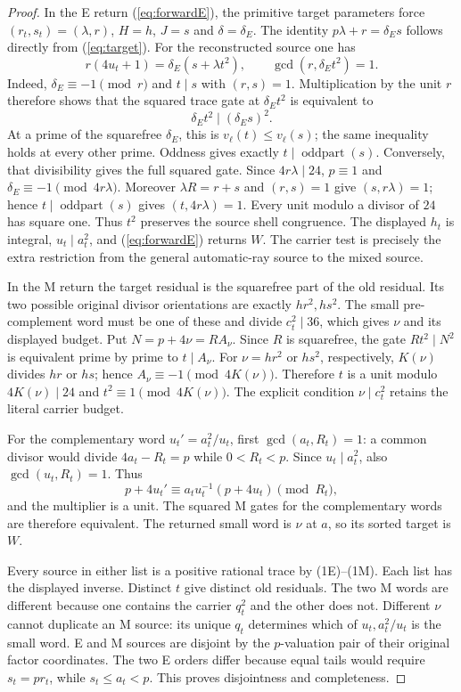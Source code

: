 \begin{proof}
In the E return (\ref{eq:forwardE}), the primitive target parameters force
$(r_t,s_t)=(\lambda,r)$, $H=h$, $J=s$ and $\delta=\delta_E$.
 The identity $p\lambda+r=\delta_Es$ follows directly from
 (\ref{eq:target}). For the reconstructed source one has
 \[
  r(4u_t+1)=\delta_E(s+\lambda t^2),\qquad
  \gcd(r,\delta_Et^2)=1.
 \]
 Indeed, $\delta_E\equiv-1\pmod r$ and
 $t\mid s$ with $(r,s)=1$. Multiplication by the unit $r$ therefore shows
 that the squared trace gate at $\delta_Et^2$ is equivalent to
\[
 \delta_Et^2\mid(\delta_Es)^2.
\]
At a prime of the squarefree $\delta_E$, this is
$v_\ell(t)\le v_\ell(s)$; the same inequality holds at every other prime.
Oddness gives exactly $t\mid\operatorname{oddpart}(s)$.
Conversely, that divisibility gives the full squared gate. Since
$4r\lambda\mid24$, $p\equiv1$ and
 $\delta_E\equiv-1\pmod{4r\lambda}$. Moreover
 $\lambda R=r+s$ and $(r,s)=1$ give $(s,r\lambda)=1$; hence
 $t\mid\operatorname{oddpart}(s)$ gives $(t,4r\lambda)=1$. Every unit
 modulo a divisor of $24$ has square one. Thus $t^2$ preserves
 the source shell congruence. The displayed $h_t$ is integral, $u_t\mid a_t^2$,
and (\ref{eq:forwardE}) returns $W$. The carrier test is precisely the extra
restriction from the general automatic-ray source to the mixed source.

In the M return the target residual is the squarefree part of the old
residual. Its two possible original divisor orientations are exactly
$hr^2,hs^2$. The small pre-complement word must be one of these and divide
$c_t^2\mid36$, which gives $\nu$ and its displayed budget.  Put
$N=p+4\nu=RA_\nu$.  Since $R$ is squarefree, the gate
$Rt^2\mid N^2$ is equivalent prime by prime to $t\mid A_\nu$.
For $\nu=hr^2$ or $hs^2$, respectively, $K(\nu)$ divides $hr$ or $hs$;
hence $A_\nu\equiv-1\pmod{4K(\nu)}$.  Therefore $t$ is a unit modulo
$4K(\nu)\mid24$ and $t^2\equiv1\pmod{4K(\nu)}$.  The explicit condition
$\nu\mid c_t^2$ retains the literal carrier budget.

For the complementary word $u_t'=a_t^2/u_t$, first
$\gcd(a_t,R_t)=1$: a common divisor would divide $4a_t-R_t=p$ while
$0<R_t<p$.  Since $u_t\mid a_t^2$, also $\gcd(u_t,R_t)=1$.  Thus
\[
 p+4u_t'\equiv a_tu_t^{-1}(p+4u_t)\pmod {R_t},
\]
and the multiplier is a unit.  The squared M gates for the complementary
words are therefore equivalent.  The returned small word is $\nu$ at $a$,
so its sorted target is $W$.

Every source in either list is a positive rational trace by (1E)--(1M).
Each list has the displayed inverse. Distinct $t$ give distinct old residuals.
The two M words are different because one contains the carrier $q_t^2$ and
the other does not. Different $\nu$ cannot duplicate an M source: its unique
 $q_t$ determines which of $u_t,a_t^2/u_t$ is the small word. E and M sources
are disjoint by the $p$-valuation pair of their original factor coordinates.
The two E orders differ because equal tails would require $s_t=pr_t$, while
$s_t\le a_t<p$. This proves disjointness and completeness.
\end{proof}

